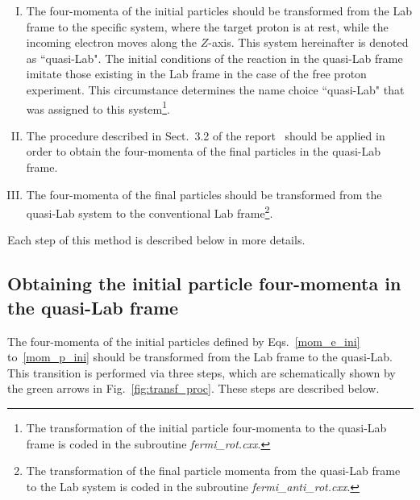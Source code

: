 \begin{enumerate}[I.]
\item The four-momenta of the initial particles should be transformed from the Lab frame to the specific system, where the target proton is at rest, while the incoming electron moves along the $Z$-axis. This system hereinafter is denoted as ``quasi-Lab". The initial conditions of the reaction in the quasi-Lab frame imitate those existing in the Lab frame in the case of the free proton experiment. This circumstance determines the name choice ``quasi-Lab" that was assigned to this system\footnote[3]{The transformation of the initial particle four-momenta to the quasi-Lab frame is coded in the subroutine \textit{fermi\_rot.cxx}.}.
\item The procedure described in Sect.~3.2 of the report~\cite{twopeg} should be applied in order to obtain the four-momenta of the final particles in the quasi-Lab frame.
\item The four-momenta of the final particles should be transformed from the quasi-Lab system to the conventional Lab frame\footnote[4]{The transformation of the final particle momenta from the quasi-Lab frame to the Lab system is coded in the subroutine \textit{fermi\_anti\_rot.cxx}.}.
\end{enumerate}

Each step of this method is described below in more details.


\subsection{Obtaining the initial particle four-momenta in the quasi-Lab frame}
\label{sect:transf}

The four-momenta of the initial particles defined by Eqs.~\eqref{mom_e_ini} to~\eqref{mom_p_ini} should be transformed from the Lab frame to the quasi-Lab. This transition is performed via three steps, which are schematically shown by the green arrows in Fig.~\ref{fig:transf_proc}. These steps are described below.


